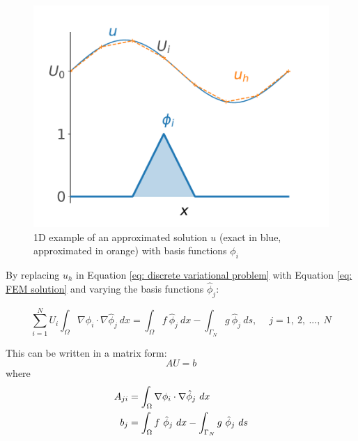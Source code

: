 \begin{figure}
    \centering
    \includegraphics[width=\linewidth]{Figures/Chapter2/approximated_solution.pdf}
    \caption{1D example of an approximated solution $u$ (exact in blue, approximated in orange) with basis functions $\phi_i$}
    \label{fig: example approximated solution}
\end{figure}

By replacing $u_h$ in Equation \ref{eq: discrete variational problem} with Equation \ref{eq: FEM solution} and varying the basis functions $\hat{\phi}_j$:

\begin{equation}
    \sum^N_{i=1} U_i \int_\Omega \nabla \phi_i \cdot \nabla \hat{\phi}_j \ dx = \int_\Omega f \ \hat{\phi}_j \ dx - \int_{\Gamma_N} g \ \hat{\phi}_j \ ds , \quad \ j = 1, \ 2, \ ..., \ N
\end{equation}

This can be written in a matrix form:
\begin{equation}
    AU = b
    \label{eq: variational problem matrix form}
\end{equation}
where
\begin{subequations}
    \begin{align}
        A_{ji} &= \int_\Omega \nabla \phi_i \cdot \nabla \hat{\phi}_j \ dx \\
        b_{j} &= \int_\Omega f \ \hat{\phi}_j \ dx - \int_{\Gamma_N} g \ \hat{\phi}_j \ ds
    \end{align}
    \labeq{eq: matrices A and b}
\end{subequations}


